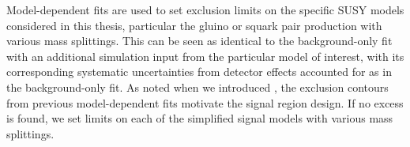 Model-dependent fits are used to set exclusion limits on the specific SUSY models considered in this thesis, particular the gluino or squark pair production with various mass splittings.
This can be seen as identical to the background-only fit with an additional simulation input from the particular model of interest, with its corresponding systematic uncertainties from detector effects accounted for as in the background-only fit.
As noted when we introduced , the exclusion contours from previous model-dependent fits motivate the signal region design.
If no excess is found, we set limits on each of the simplified signal models with various mass splittings.
